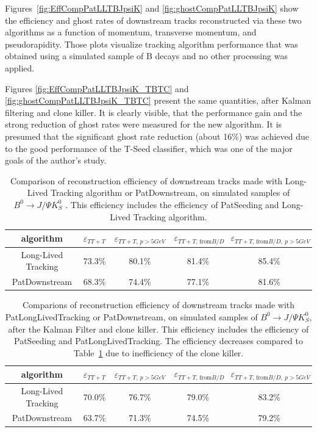 Figures~\ref{fig:EffCompPatLLTBJpsiK} and \ref{fig:ghostCompPatLLTBJpsiK} show the efficiency and ghost rates of downstream tracks reconstructed via these two algorithms as a function of momentum, transverse momentum, and pseudorapidity. Those plots visualize tracking algorithm performance that was obtained using a simulated sample of B decays and no other processing was applied. 

Figures \ref{fig:EffCompPatLLTBJpsiK_TBTC} and \ref{fig:ghostCompPatLLTBJpsiK_TBTC} present the same quantities, after Kalman filtering and clone killer. 
It is clearly visible, that the performance gain and the strong reduction of ghost rates were measured for the new algorithm. It is presumed that the significant ghost rate reduction (about 16\%) was achieved due to the good performance of the T-Seed classifier, which was one of the major goals of the author’s study. 

\begin{table}[htp]
\caption{Comparison of reconstruction efficiency of downstream tracks made with Long-Lived Tracking algorithm or PatDownstream, on simulated samples of $B^{0} \rightarrow J/\Psi K^{0}_{S}$ . This efficiency includes the efficiency of PatSeeding and Long-Lived Tracking algorithm.}
\begin{center}
\begin{tabular}{c|c|c|c|c}
algorithm & $\varepsilon_{TT+T}$ & $\varepsilon_{TT+T, ~p>5 GeV}$ & $\varepsilon_{TT+T\text{, from} B/D}$ & $\varepsilon_{TT+T\text{, from} B/D, ~p>5 GeV}$ \\
\hline 
Long-Lived Tracking & 73.3\% & 80.1\% & 81.4\% & 85.4\%\\
PatDownstream          & 68.3\% & 74.4\% & 77.1\% & 81.6\% 
\end{tabular}
\end{center}
\label{tab:PatLLTPatDownstreamEffComp}
\end{table}%

\begin{table}[htp]
\caption{Comparions of reconstruction efficiency of downstream tracks made with PatLongLivedTracking or PatDownstream, on simulated samples of $B^{0} \rightarrow J/\Psi K^{0}_{S}$, after the Kalman Filter and clone killer. This efficiency includes the efficiency of PatSeeding and PatLongLivedTracking. The efficiency decreases compared to Table~\ref{tab:PatLLTPatDownstreamEffComp} due to inefficiency of the clone killer.}
\begin{center}
\begin{tabular}{c|c|c|c|c}
algorithm & $\varepsilon_{TT+T}$ & $\varepsilon_{TT+T, ~p>5 GeV}$ & $\varepsilon_{TT+T\text{, from} B/D}$ & $\varepsilon_{TT+T\text{, from} B/D, ~p>5 GeV}$ \\
\hline 
Long-Lived Tracking & 70.0\% & 76.7\% & 79.0\% & 83.2\% \\
PatDownstream          & 63.7\% & 71.3\% & 74.5\% & 79.2\% 
\end{tabular}
\end{center}
\label{tab:PatLLTPatDownstreamEffCompTBTC}
\end{table}%

